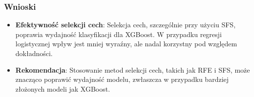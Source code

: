 \documentclass{article}
\begin{document}
\subsubsection{Wnioski}
\begin{itemize}
    \item \textbf{Efektywność selekcji cech}: Selekcja cech, szczególnie przy użyciu SFS, poprawia wydajność klasyfikacji dla XGBoost. W przypadku regresji logistycznej wpływ jest mniej wyraźny, ale nadal korzystny pod względem dokładności.
    \item \textbf{Rekomendacja}: Stosowanie metod selekcji cech, takich jak RFE i SFS, może znacząco poprawić wydajność modelu, zwłaszcza w przypadku bardziej złożonych modeli jak XGBoost.
\end{itemize}
\end{document}
